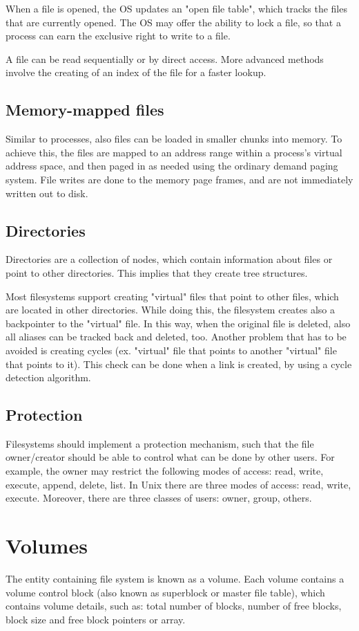 When a file is opened, the OS updates an "open file table", which tracks the files that are currently opened. The OS may offer the ability to lock a file, so that a process can earn the exclusive right to write to a file.

A file can be read sequentially or by direct access. More advanced methods involve the creating of an index of the file for a faster lookup.

\subsection{Memory-mapped files}
Similar to processes, also files can be loaded in smaller chunks into memory. To achieve this, the files are mapped to an address range within a process's virtual address space, and then paged in as needed using the ordinary demand paging system. File writes are done to the memory page frames, and are not immediately written out to disk.

\subsection{Directories}
Directories are a collection of nodes, which contain information about files or point to other directories. This implies that they create tree structures.

Most filesystems support creating "virtual" files that point to other files, which are located in other directories. While doing this, the filesystem creates also a backpointer to the "virtual" file. In this way, when the original file is deleted, also all aliases can be tracked back and deleted, too. Another problem that  has to be avoided is creating cycles (ex. "virtual" file that points to another "virtual" file that points to it). This check can be done when a link is created, by using a cycle detection algorithm.

\subsection{Protection}
Filesystems should implement a protection mechanism, such that the file owner/creator should be able to control what can be done by other users. For example, the owner may restrict the following modes of access: read, write, execute, append, delete, list. In Unix there are three modes of access: read, write, execute. Moreover, there are three classes of users: owner, group, others.

\section{Volumes}
The entity containing file system is known as a volume. Each volume contains a volume control block (also known as superblock or master file table), which contains volume details, such as: total number of blocks, number of free blocks, block size and free block pointers or array.

